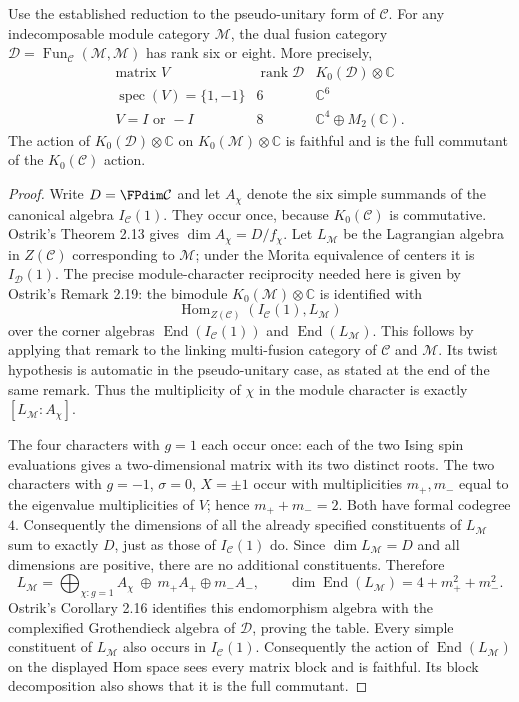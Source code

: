 \begin{theorem}
Use the established reduction to the pseudo-unitary form of $\mathcal C$.
For any indecomposable module category $\mathcal M$, the dual fusion category
$\mathcal D=\operatorname{Fun}_{\mathcal C}(\mathcal M,\mathcal M)$ has rank six or eight.
More precisely,
\[
\begin{array}{c|c|c}
\text{matrix }V&\operatorname{rank}\mathcal D&
K_0(\mathcal D)\otimes\mathbb C\\\hline
\operatorname{spec}(V)=\{1,-1\}&6&\mathbb C^6\\
V=I\text{ or }-I&8&\mathbb C^4\oplus M_2(\mathbb C).
\end{array}
\]
The action of $K_0(\mathcal D)\otimes\mathbb C$ on
$K_0(\mathcal M)\otimes\mathbb C$ is faithful and is the full commutant of
the $K_0(\mathcal C)$ action.
\end{theorem}
\begin{proof}
Write $D=\FPdim\mathcal C$ and let $A_\chi$ denote the six simple summands
of the canonical algebra $I_{\mathcal C}(1)$. They occur once, because
$K_0(\mathcal C)$ is commutative. Ostrik's Theorem 2.13 gives
$\dim A_\chi=D/f_\chi$.
Let $L_\mathcal M$ be the Lagrangian algebra in $Z(\mathcal C)$ corresponding to
$\mathcal M$; under the Morita equivalence of centers it is $I_{\mathcal D}(1)$.
The precise module-character reciprocity needed here is given by
Ostrik's Remark 2.19: the bimodule $K_0(\mathcal M)\otimes\mathbb C$ is
identified with
\[
\operatorname{Hom}_{Z(\mathcal C)}(I_{\mathcal C}(1),L_\mathcal M)
\]
over the corner algebras $\operatorname{End}(I_{\mathcal C}(1))$ and
$\operatorname{End}(L_\mathcal M)$. This follows by applying that remark to
the linking multi-fusion category of $\mathcal C$ and $\mathcal M$.
Its twist hypothesis is automatic in the pseudo-unitary case, as stated
at the end of the same remark. Thus the multiplicity of $\chi$ in the
module character is exactly $[L_\mathcal M:A_\chi]$.

The four characters with $g=1$ each occur once: each of the two Ising
spin evaluations gives a two-dimensional matrix with its two distinct
roots. The two characters with $g=-1$, $\sigma=0$, $X=\pm1$ occur
with multiplicities $m_+,m_-$ equal to the eigenvalue multiplicities of
$V$; hence $m_++m_-=2$. Both have formal codegree $4$. Consequently
the dimensions of all the already specified constituents of $L_\mathcal M$ sum
to exactly $D$, just as those of $I_{\mathcal C}(1)$ do. Since
$\dim L_\mathcal M=D$ and all dimensions are positive, there are no additional
constituents. Therefore
\[
L_\mathcal M=\bigoplus_{\chi:g=1}A_\chi\ \oplus\ m_+A_+\oplus m_-A_-,
\qquad
\dim\operatorname{End}(L_\mathcal M)=4+m_+^2+m_-^2.
\]
Ostrik's Corollary 2.16 identifies this endomorphism algebra with the
complexified Grothendieck algebra of $\mathcal D$, proving the table.
Every simple constituent of $L_\mathcal M$ also occurs in $I_{\mathcal C}(1)$.
Consequently the action of $\operatorname{End}(L_\mathcal M)$ on the displayed
Hom space sees every matrix block and is faithful. Its block
decomposition also shows that it is the full commutant.
\end{proof}

